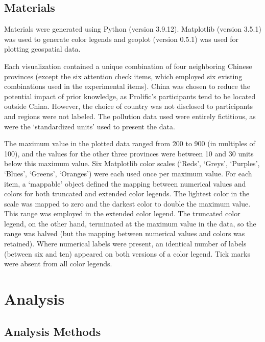 \documentclass[
]{interact}
\begin{document}
\hypertarget{materials}{%
\subsection{Materials}\label{materials}}

Materials were generated using Python (version 3.9.12). Matplotlib
(version 3.5.1) was used to generate color legends and geoplot (version
0.5.1) was used for plotting geospatial data.

Each visualization contained a unique combination of four neighboring
Chinese provinces (except the six attention check items, which employed
six existing combinations used in the experimental items). China was
chosen to reduce the potential impact of prior knowledge, as Prolific's
participants tend to be located outside China. However, the choice of
country was not disclosed to participants and regions were not labeled.
The pollution data used were entirely fictitious, as were the
`standardized units' used to present the data.

The maximum value in the plotted data ranged from 200 to 900 (in
multiples of 100), and the values for the other three provinces were
between 10 and 30 units below this maximum value. Six Matplotlib color
scales (`Reds', `Greys', `Purples', `Blues', `Greens', `Oranges') were
each used once per maximum value. For each item, a `mappable' object
defined the mapping between numerical values and colors for both
truncated and extended color legends. The lightest color in the scale
was mapped to zero and the darkest color to double the maximum value.
This range was employed in the extended color legend. The truncated
color legend, on the other hand, terminated at the maximum value in the
data, so the range was halved (but the mapping between numerical values
and colors was retained). Where numerical labels were present, an
identical number of labels (between six and ten) appeared on both
versions of a color legend. Tick marks were absent from all color
legends.

\hypertarget{analysis}{%
\section{Analysis}\label{analysis}}

\hypertarget{analysis-methods}{%
\subsection{Analysis Methods}\label{analysis-methods}}
\end{document}
